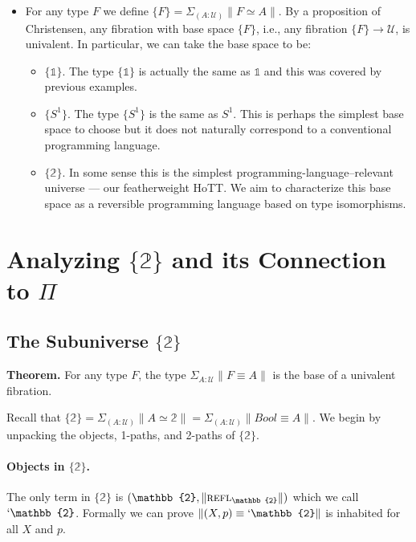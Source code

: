 \documentclass{entcs}
\newcommand{\reflp}{\textsc{refl}}
\newcommand{\ot}{\mathbb{1}}
\newcommand{\bt}{\mathbb{2}}
\begin{document}
\begin{itemize}
\item For any type $F$ we define
  $\{F\} = \Sigma_{(A : \mathcal{U})} \| F \simeq A \|$. By a proposition of
  Christensen, any fibration with base space $\{F\}$, i.e., any fibration
  $\{F\} \to \mathcal{U}$, is univalent. In particular, we can take the base
  space to be:
  \begin{itemize}
  \item $\{\ot\}$. The type $\{\ot\}$ is actually the same as $\ot$ and this was
    covered by previous examples.
  \item $\{S^1\}$. The type $\{S^1\}$ is the same as $S^1$. This is perhaps the
    simplest base space to choose but it does not naturally correspond to a
    conventional programming language.
  \item $\{\bt\}$. In some sense this is the simplest
    programming-language--relevant universe --- our featherweight HoTT. We aim
    to characterize this base space as a reversible programming language based
    on type isomorphisms.
  \end{itemize}

\end{itemize}

\section{Analyzing $\{\bt\}$ and its Connection to $\Pi$}

\subsection{The Subuniverse $\{\bt\}$}

\textbf{Theorem.} For any type $F$, the type $\Sigma_{A:\mathcal{U}} \| F \equiv A \|$ is the base
of a univalent fibration.


Recall that
$\{\bt\} = \Sigma_{(A:\mathcal{U})} \|A \simeq \bt\| = \Sigma_{(A:\mathcal{U})}
\| \mathit{Bool} \equiv A\|$. We begin by unpacking the objects, 1-paths, and 2-paths of
$\{\bt\}$.

\paragraph*{Objects in $\{\bt\}$.} The only term in $\{\bt\}$ is
$(\bt,\|\reflp_{\bt}\|)$ which we call $`\bt$. Formally we can prove
$\|(X,p) \equiv `\bt\|$ is inhabited for all $X$ and $p$.
\end{document}
